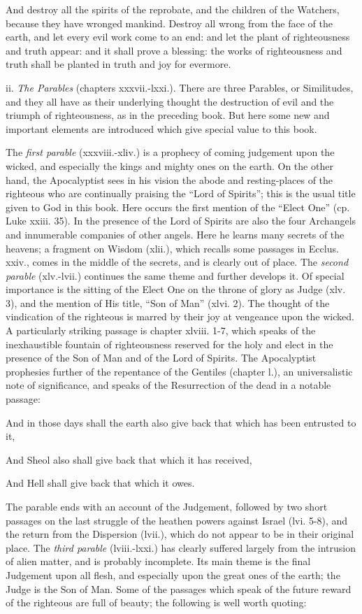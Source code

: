 And destroy all the spirits of the reprobate, and the
children of the Watchers, because they have wronged mankind.
Destroy all wrong from the face of the earth, and
let every evil work come to an end: and let the plant of
righteousness and truth appear: and it shall prove a blessing:
the works of righteousness and truth shall be planted
in truth and joy for evermore.

ii. \emph{The Parables} (chapters xxxvii.-lxxi.). There
are three Parables, or Similitudes, and they all have
as their underlying thought the destruction of evil
and the triumph of righteousness, as in the preceding
book. But here some new and important elements
are introduced which give special value to this book.

The \emph{first parable} (xxxviii.-xliv.) is a prophecy of
coming judgement upon the wicked, and especially
the kings and mighty ones on the earth. On the
other hand, the Apocalyptist sees in his vision the
abode and resting-places of the righteous who are
continually praising the “Lord of Spirits”; this is the
usual title given to God in this book. Here occurs
the first mention of the “Elect One” (cp. Luke xxiii.
35). In the presence of the Lord of Spirits are also
the four Archangels and innumerable companies
of other angels. Here he learns many secrets of
the heavens; a fragment on Wisdom (xlii.), which
recalls some passages in Ecclus. xxiv., comes in the
middle of the secrets, and is clearly out of place. The
\emph{second parable} (xlv.-lvii.) continues the same theme
and further develops it. Of special importance is
the sitting of the Elect One on the throne of glory
as Judge (xlv. 3), and the mention of His title, “Son
of Man” (xlvi. 2). The thought of the vindication
of the righteous is marred by their joy at vengeance
upon the wicked. A particularly striking passage is
chapter xlviii. 1-7, which speaks of the inexhaustible
fountain of righteousness reserved for the holy and
elect in the presence of the Son of Man and of the
Lord of Spirits. The Apocalyptist prophesies further
of the repentance of the Gentiles (chapter l.), an
universalistic note of significance, and speaks of the
Resurrection of the dead in a notable passage:

And in those days shall the earth also give back that which has been entrusted to it,

And Sheol also shall give back that which it has received,

And Hell shall give back that which it owes.

The parable ends with an account of the Judgement,
followed by two short passages on the last struggle
of the heathen powers against Israel (lvi. 5-8), and
the return from the Dispersion (lvii.), which do not
appear to be in their original place. The \emph{third
parable} (lviii.-lxxi.) has clearly suffered largely from
the intrusion of alien matter, and is probably incomplete.
Its main theme is the final Judgement
upon all flesh, and especially upon the great ones
of the earth; the Judge is the Son of Man. Some of
the passages which speak of the future reward of
the righteous are full of beauty; the following is
well worth quoting:

